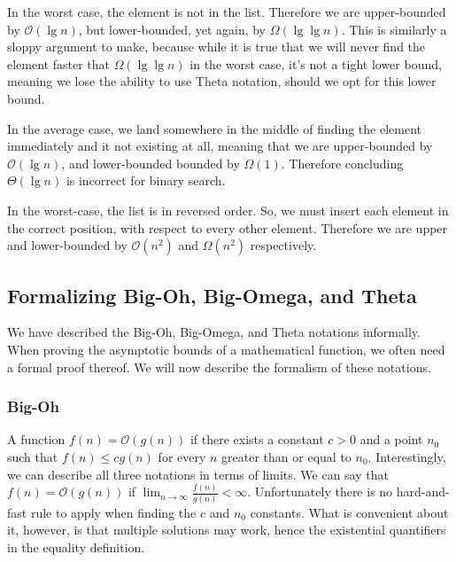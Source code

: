 In the worst case, the element is not in the list. Therefore we are upper-bounded by $\mathcal{O}(\lg{n})$, but lower-bounded, yet again, by $\Omega(\lg\lg{n})$. This is similarly a sloppy argument to make, because while it is true that we will never find the element faster that $\Omega(\lg\lg{n})$ in the worst case, it's not a tight lower bound, meaning we lose the ability to use Theta notation, should we opt for this lower bound.

In the average case, we land somewhere in the middle of finding the element immediately and it not existing at all, meaning that we are upper-bounded by $\mathcal{O}(\lg{n})$, and lower-bounded bounded by $\Omega(1)$. Therefore concluding $\Theta(\lg{n})$ is incorrect for binary search.


In the worst-case, the list is in reversed order. So, we must insert each element in the correct position, with respect to every other element. Therefore we are upper and lower-bounded by $\mathcal{O}(n^2)$ and $\Omega(n^2)$ respectively.

\subsection*{Formalizing Big-Oh, Big-Omega, and Theta}
We have described the Big-Oh, Big-Omega, and Theta notations informally. When proving the asymptotic bounds of a mathematical function, we often need a formal proof thereof. We will now describe the formalism of these notations.

\subsubsection*{Big-Oh}
A function $f(n) = \mathcal{O}(g(n))$ if there exists a constant $c > 0$ and a point $n_0$ such that $f(n) \leq cg(n)$ for every $n$ greater than or equal to $n_0$. Interestingly, we can describe all three notations in terms of limits. We can say that $f(n) = \mathcal{O}(g(n))$ if $\lim_{n \to \infty} \frac{f(n)}{g(n)} < \infty$. Unfortunately there is no hard-and-fast rule to apply when finding the $c$ and $n_0$ constants. What is convenient about it, however, is that multiple solutions may work, hence the existential quantifiers in the equality definition.

